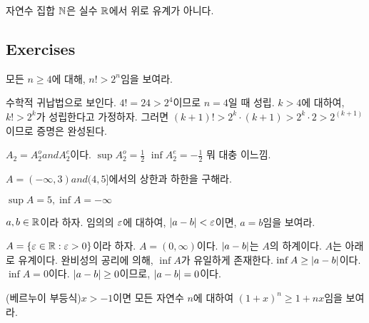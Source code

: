 자연수 집합 $\mathbb{N}$은 실수 $\mathbb{R}$에서 위로 유계가 아니다.


\subsection*{Exercises}

\begin{exercise}
  모든 $n \ge 4$에 대해, $n! > 2^n$임을 보여라.
\end{exercise}

\begin{solution}
  수학적 귀납법으로 보인다.
  $4! = 24 > 2^4$이므로 $n = 4$일 때 성립.
  $k > 4$에 대하여, $k! > 2^k$가 성립한다고 가정하자. 그러면
  $(k + 1)! > 2^k \cdot (k + 1) > 2^k \cdot 2 > 2^(k + 1)$이므로 증명은 완성된다.
\end{solution}

\begin{exercise}

\end{exercise}

\begin{solution}
  $A_2 = A_2^o and A_2^e$이다.
  $\sup A_2^o = \frac{1}{2}$
  $\inf A_2^e = -\frac{1}{2}$ 뭐 대충 이느낌.
\end{solution}

\begin{exercise}
  $A = (-\infty, 3) and (4, 5]$에서의 상한과 하한을 구해라.
\end{exercise}

\begin{solution}
  $\sup A = 5, \inf A  = -\infty$
\end{solution}

\begin{exercise}
  $a, b \in \mathbb{R}$이라 하자. 임의의 $\varepsilon$에 대하여, $\left| a-b \right| < \varepsilon$이면, $a = b$임을 보여라.
\end{exercise}

\begin{solution}
  $A = \{\varepsilon \in \mathbb{R} : \varepsilon > 0\}$이라 하자. $A = (0, \infty)$이다.
  $\left| a - b \right|$는 $A$의 하계이다. $A$는 아래로 유계이다.
  완비성의 공리에 의해, $\inf A$가 유일하게 존재한다. $\inf A \ge \left| a - b \right|$이다.
  $\inf A = 0$이다. $\left| a - b \right| \ge 0$이므로, $\left| a - b \right| = 0$이다.
\end{solution}

\begin{exercise}
  (베르누이 부등식)$x > -1$이면 모든 자연수 $n$에 대하여 $(1 + x)^n \ge 1 + nx$임을 보여라.
\end{exercise}

